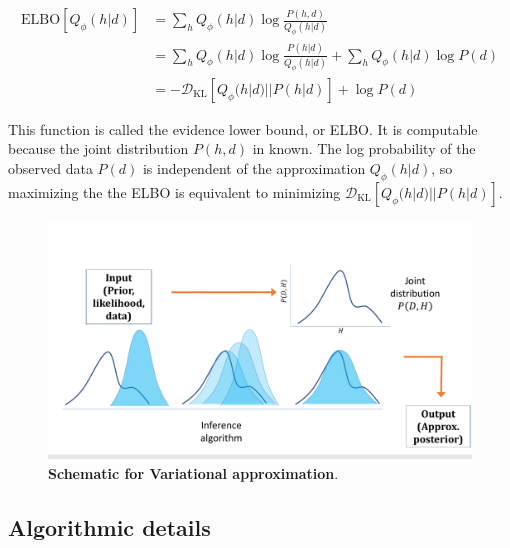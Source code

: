 \begin{align}
\text{ELBO}[Q_\phi(h|d)] &=  \sum_h Q_\phi(h|d) \log \frac{P(h,d)}{Q_\phi(h|d)} \\
& = \sum_h Q_\phi(h|d) \log \frac{P(h|d)}{Q_\phi(h|d)} + \sum_h Q_\phi(h|d) \log P(d) \\
& = - \mathcal{D}_{\text{KL}}[Q_\phi(h|d)||P(h|d)]  + \log P(d)
\end{align}

This function is called the evidence lower bound, or ELBO. It is computable because the joint distribution $P(h, d)$ in known. The log probability of the observed data $P(d)$ is independent of the approximation $Q_\phi(h|d)$, so maximizing the the ELBO is equivalent to minimizing $\mathcal{D}_{\text{KL}}[Q_\phi(h|d)||P(h|d)] $.

\begin{figure}
\centering
\includegraphics[width = \textwidth]{figures/variational_schematic.pdf}
\caption{\textbf{Schematic for Variational approximation}. }
\label{fig:var_schematic}
\end{figure}


\subsection{Algorithmic details}


